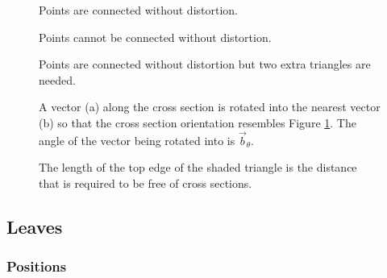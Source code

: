 \documentclass[10pt]{article}
\begin{document}
\begin{figure}[H]
 \begin{minipage}[b]{0.46\textwidth}
  \centering
   
  \caption{Points are connected without distortion.} \label{fig:fork1}
 \end{minipage}
 \hfill
 \begin{minipage}[b]{0.46\textwidth}
  \centering
  
  \caption{Points cannot be connected without distortion.}
 \end{minipage}
\end{figure}
\begin{figure}[H]
 \begin{minipage}[b]{0.46\textwidth}
  \centering
   
  \caption{Points are connected without distortion but two extra triangles are needed.}
 \end{minipage}
 \hfill
 \begin{minipage}[b]{0.46\textwidth}
  \centering
  
  \caption{A vector (a) along the cross section is rotated into the nearest vector (b) so that the cross section orientation resembles Figure \ref{fig:fork1}. The angle of the vector being rotated into is $ \vec{b}_{\theta} $.} \label{fig:forktopangle}
 \end{minipage}
\end{figure}
\begin{figure}[H]
 \begin{minipage}[t]{0.46\textwidth}
  \vspace{0pt}
  \centering
  
 \end{minipage}
 \begin{minipage}[t]{0.46\textwidth}
  \vspace{0pt}
  \caption{The length of the top edge of the shaded triangle is the distance that is required to be free of cross sections.} \label{fig:forkside}
 \end{minipage}
\end{figure}

\subsection{Leaves}

\subsubsection{Positions}
\end{document}
